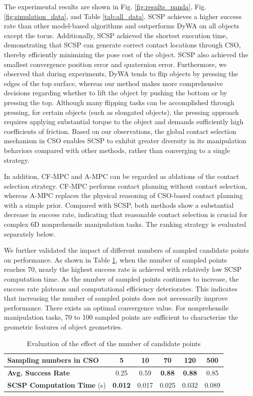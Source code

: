 The experimental results are shown in Fig. \ref{fig:results_panda}, Fig. \ref{fig:simulation_data}, and Table \ref{tab:all_data}. SCSP achieves a higher success rate than other model-based algorithms and outperforms DyWA on all objects except the torus. Additionally, SCSP achieved the shortest execution time, demonstrating that SCSP can generate correct contact locations through CSO, thereby efficiently minimizing the pose cost of the object. SCSP also achieved the smallest convergence position error and quaternion error. Furthermore, we observed that during experiments, DyWA tends to flip objects by pressing the edges of the top surface, whereas our method makes more comprehensive decisions regarding whether to lift the object by pushing the bottom or by pressing the top. Although many flipping tasks can be accomplished through pressing, for certain objects (such as elongated objects), the pressing approach requires applying substantial torque to the object and demands sufficiently high coefficients of friction. Based on our observations, the global contact selection mechanism in CSO enables SCSP to exhibit greater diversity in its manipulation behaviors compared with other methods, rather than converging to a single strategy. 

In addition, CF-MPC and A-MPC can be regarded as ablations of the contact selection strategy. CF-MPC performs contact planning without contact selection, whereas A-MPC replaces the physical reasoning of CSO-based contact planning with a simple prior. Compared with SCSP, both methods show a substantial decrease in success rate, indicating that reasonable contact selection is crucial for complex 6D nonprehensile manipulation tasks. The ranking strategy is evaluated separately below.

We further validated the impact of different numbers of sampled candidate points on performance. As shown in Table \ref{tab:cso_sampling}, when the number of sampled points reaches 70, nearly the highest success rate is achieved with relatively low SCSP computation time. As the number of sampled points continues to increase, the success rate plateaus and computational efficiency deteriorates. This indicates that increasing the number of sampled points does not necessarily improve performance. There exists an optimal convergence value. For nonprehensile manipulation tasks, 70 to 100 sampled points are sufficient to characterize the geometric features of object geometries.


\begin{table}[t]
\centering
\caption{Evaluation of the effect of the number of candidate points}
\label{tab:cso_sampling}
\begin{tabular}{lccccc}
\toprule
\textbf{Sampling numbers in CSO} & \textbf{5} & \textbf{10} & \textbf{70} & \textbf{120} & \textbf{500} \\
\midrule
\textbf{Avg. Success Rate}      & 0.25  & 0.59 & \textbf{0.88} & \textbf{0.88} & 0.85 \\
\textbf{SCSP Computation Time} (s)  & \textbf{0.012} & 0.017 & 0.025 & 0.032 & 0.089 \\
\bottomrule
\end{tabular}
\end{table}


